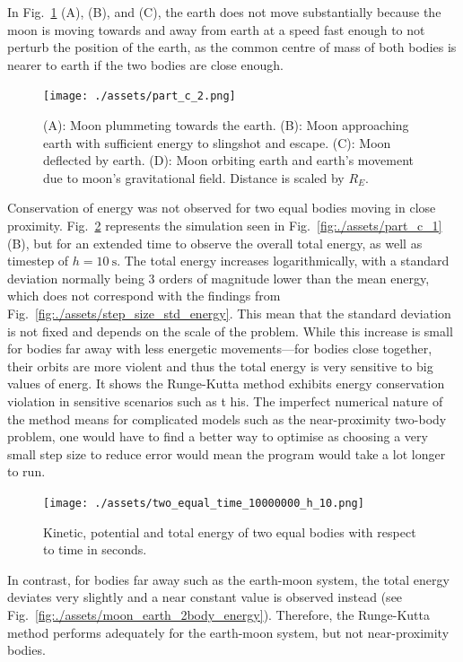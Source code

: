 \documentclass[hyphens,twocolumn,nobalancelastpage,aps,10pt,citeautoscript,longbibliography]{revtex4-2}
\begin{document}
In Fig.~\ref{fig:./assets/part_c_2} (A), (B), and (C), the earth does not move
substantially because the moon is moving towards and away from earth at a speed
fast enough to not perturb the position of the earth, as the common centre of
mass of both bodies is nearer to earth if the two bodies are close enough.

\begin{figure}[htpb]
	\centering
	\texttt{[image: ./assets/part\_c\_2.png]}
	\caption{(A): Moon plummeting towards the earth. (B): Moon approaching
	earth with sufficient energy to slingshot and escape. (C): Moon deflected
	by earth. (D): Moon orbiting earth and earth's movement due to moon's
	gravitational field. Distance is scaled by $R_E$.}%
	\label{fig:./assets/part_c_2}
\end{figure}

Conservation of energy was not observed for two equal bodies moving in close
proximity. Fig.~\ref{fig:./assets/two_equal_time_10000000_h_10} represents the
simulation seen in Fig.~\ref{fig:./assets/part_c_1} (B), but for an extended
time to observe the overall total energy, as well as timestep of $h =
\qty{10}{\second}$. The total energy increases logarithmically, with a standard
deviation normally being 3 orders of magnitude lower than the mean energy,
which does not correspond with the findings from
Fig.~\ref{fig:./assets/step_size_std_energy}. This mean that the standard
deviation is not fixed and depends on the scale of the problem. While this
increase is small for bodies far away with less energetic movements---for
bodies close together, their orbits are more violent and thus the total energy
is very sensitive to big values of energ. It shows the Runge-Kutta method
exhibits energy conservation violation in sensitive scenarios such as t his.
The imperfect numerical nature of the method means for complicated models such
as the near-proximity two-body problem, one would have to find a better way to
optimise as choosing a very small step size to reduce error would mean the
program would take a lot longer to run.

\begin{figure}[htpb]
	\centering
	\texttt{[image: ./assets/two\_equal\_time\_10000000\_h\_10.png]}
	\caption{Kinetic, potential and total energy of two equal bodies with
	respect to time in seconds.}%
	\label{fig:./assets/two_equal_time_10000000_h_10}
\end{figure}

In contrast, for bodies far away such as the earth-moon system, the total
energy deviates very slightly and a near constant value is observed instead
(see Fig.~\ref{fig:./assets/moon_earth_2body_energy}). Therefore, the
Runge-Kutta method performs adequately for the earth-moon system, but not
near-proximity bodies.
\end{document}
